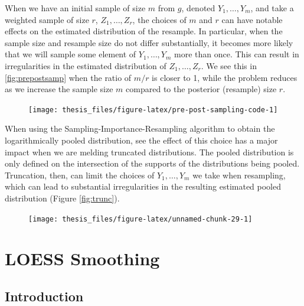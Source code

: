 \documentclass[12pt,twoside]{smiththesis}
\begin{document}
When we have an initial sample of size \(m\) from \(g\), denoted \(Y_1,\dots,Y_m\), and take a weighted sample of size \(r\), \(Z_1,\dots,Z_r\), the choices of \(m\) and \(r\) can have notable effects on the estimated distribution of the resample. In particular, when the sample size and resample size do not differ substantially, it becomes more likely that we will sample some element of \(Y_1,\dots,Y_m\) more than once. This can result in irregularities in the estimated distribution of \(Z_1,\dots,Z_r\). We see this in \ref{fig:prepostsamp} when the ratio of \(m/r\) is closer to 1, while the problem reduces as we increase the sample size \(m\) compared to the posterior (resample) size \(r\).
\begin{figure}

{\centering \texttt{[image: thesis\_files/figure-latex/pre-post-sampling-code-1]} 

}

\caption{\label{fig:prepostsamp}}\label{fig:pre-post-sampling-code}
\end{figure}
When using the Sampling-Importance-Resampling algorithm to obtain the logarithmically pooled distribution, see the effect of this choice has a major impact when we are melding truncated distributions. The pooled distribution is only defined on the intersection of the supports of the distributions being pooled. Truncation, then, can limit the choices of \(Y_1,\dots, Y_m\) we take when resampling, which can lead to substantial irregularities in the resulting estimated pooled distribution (Figure \ref{fig:trunc}).
\begin{figure}

{\centering \texttt{[image: thesis\_files/figure-latex/unnamed-chunk-29-1]} 

}

\caption{\label{fig:trunc}}\label{fig:unnamed-chunk-29}
\end{figure}
\newpage

\hypertarget{loess-smoothing}{%
\section{LOESS Smoothing}\label{loess-smoothing}}

\hypertarget{introduction-1}{%
\subsection{Introduction}\label{introduction-1}}
\end{document}
